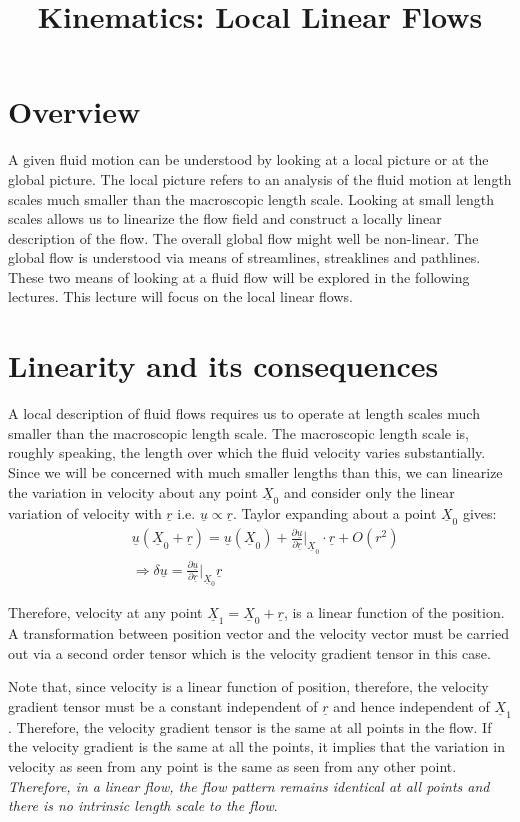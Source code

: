 \documentclass[11pt,a4paper]{article}
\title{Kinematics: Local Linear Flows}
\date{\displaydate{date}}
\author{}
\newcommand{\dl}{\delta}
\newcommand{\pd}[2]{\frac{\partial #1}{\partial #2}}
\newcommand{\vv}[1]{\underline{#1}}
\newcommand{\vu}{\underline{u}}
\newcommand{\1}{\vect{1}}
\newcommand{\RA}{\Rightarrow}
\newcommand{\at}[1]{\bigg|_{#1}}
\begin{document}
\maketitle

\section*{Overview}

A given fluid motion can be understood by looking at a local picture or at the global picture. The local picture refers to an analysis of the fluid motion at length scales much smaller than the macroscopic length scale. Looking at small length scales allows us to linearize the flow field and construct a locally linear description of the flow. The overall global flow might well be non-linear. The global flow is understood via means of streamlines, streaklines and pathlines. These two means of looking at a fluid flow will be explored in the following lectures. This lecture will focus on the local linear flows.

\section{Linearity and its consequences}

A local description of fluid flows requires us to operate at length scales much smaller than the macroscopic length scale. The macroscopic length scale is, roughly speaking, the length over which the fluid velocity varies substantially. Since we will be concerned with much smaller lengths than this, we can linearize the variation in velocity about any point $\vv X_0$ and consider only the linear variation of velocity with $\vv r$ i.e. $\vv u \propto \vv r$. Taylor expanding about a point $\vv X_0$ gives:
\begin{align}
&\vv u(\vv X_0 + \vv r) = \vv u(\vv X_0) + \pd{\vv u}{\vv r}\bigg|_{\vv X_0}\cdot \vv r + O(r^2)\\
&\RA \dl\vu = \pd{\vv u}{\vv r}\at{\vv X_0} \vv r
\end{align}

Therefore, velocity at any point $\vv X_1 = \vv X_0 + \vv r$, is a linear function of the position. A transformation between position vector and the velocity vector must be carried out via a second order tensor which is the velocity gradient tensor in this case. 

Note that, since velocity is a linear function of position, therefore, the velocity gradient tensor must be a constant independent of $\vv r$ and hence independent of $\vv X_1$. Therefore, the velocity gradient tensor is the same at all points in the flow. If the velocity gradient is the same at all the points, it implies that the variation in velocity as seen from any point is the same as seen from any other point. \textit{Therefore, in a linear flow, the flow pattern remains identical at all points and there is no intrinsic length scale to the flow}. 
\end{document}

